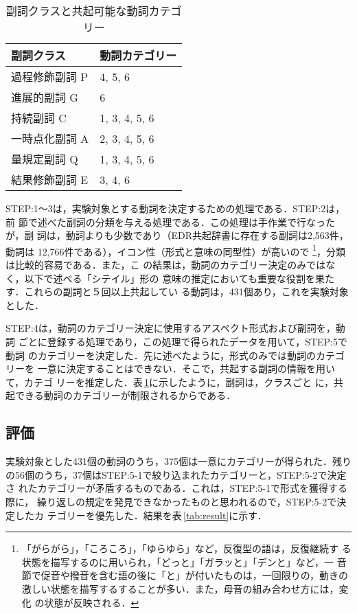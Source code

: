 \begin{table}[htb]
\caption{副詞クラスと共起可能な動詞カテゴリー}
\label{tab:adverb2}
\centering
\begin{tabular}{|l|l|}  \hline
副詞クラス      & 動詞カテゴリー \\ \hline\hline
過程修飾副詞   {\sf P}    & 4, 5, 6 \\ \hline
進展的副詞     {\sf G}    & 6 \\ \hline
持続副詞       {\sf C}    & 1, 3, 4, 5, 6 \\ \hline
一時点化副詞   {\sf A}    & 2, 3, 4, 5, 6 \\ \hline
量規定副詞     {\sf Q}    & 1, 3, 4, 5, 6 \\ \hline
結果修飾副詞   {\sf E}    & 3, 4, 6 \\ \hline 
\end{tabular}
\end{table}

STEP:1〜3は，実験対象とする動詞を決定するための処理である．STEP:2は，前
節で述べた副詞の分類を与える処理である．この処理は手作業で行なったが，副
詞は，動詞よりも少数であり（EDR共起辞書に存在する副詞は2,563件，動詞は
12,766件である），イコン性（形式と意味の同型性）が高いので
\footnote{
  「がらがら」，「ころころ」，「ゆらゆら」など，反復型の語は，反復継続す
  る状態を描写するのに用いられ，「どっと」「ガラッと」「デンと」など，一
  音節で促音や撥音を含む語の後に「と」が付いたものは，一回限りの，動きの
  激しい状態を描写するすることが多い．また，母音の組み合わせ方には，変化
  の状態が反映される\cite{大坪82}． }，分類は比較的容易である．また，こ
の結果は，動詞のカテゴリー決定のみではなく，以下で述べる「シテイル」形の
意味の推定においても重要な役割を果たす．これらの副詞と５回以上共起してい
る動詞は，431個あり，これを実験対象とした．

STEP:4は，動詞のカテゴリー決定に使用するアスペクト形式および副詞を，動詞
ごとに登録する処理であり，この処理で得られたデータを用いて，STEP:5で動詞
のカテゴリーを決定した．先に述べたように，形式のみでは動詞のカテゴリーを
一意に決定することはできない．そこで，共起する副詞の情報を用いて，カテゴ
リーを推定した．表\,\ref{tab:adverb2}に示したように，副詞は，クラスごと
に，共起できる動詞のカテゴリーが制限されるからである．

\subsection{評価}

実験対象とした431個の動詞のうち，375個は一意にカテゴリーが得られた．残り
の56個のうち，37個はSTEP:5-1で絞り込まれたカテゴリーと，STEP:5-2で決定さ
れたカテゴリーが矛盾するものである．これは，STEP:5-1で形式を獲得する際に，
繰り返しの規定を発見できなかったものと思われるので，STEP:5-2で決定したカ
テゴリーを優先した．結果を表\,\ref{tab:result}に示す．


